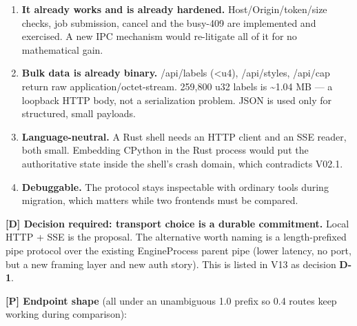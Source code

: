 \documentclass[10pt,a4paper]{article}
\newcommand{\tightlist}{\setlength{\itemsep}{2pt}\setlength{\parskip}{0pt}}
\begin{document}
\begin{enumerate}
\def\labelenumi{\arabic{enumi}.}
\tightlist
\item
  \textbf{It already works and is already hardened.} Host/Origin/token/size checks, job submission, cancel and the busy-409 are implemented and exercised. A new IPC mechanism would re-litigate all of it for no mathematical gain.
\item
  \textbf{Bulk data is already binary.} {\codefont /\allowbreak{}api/\allowbreak{}labels} ({\codefont <u4}), {\codefont /\allowbreak{}api/\allowbreak{}styles}, {\codefont /\allowbreak{}api/\allowbreak{}cap} return raw {\codefont application/\allowbreak{}octet-\allowbreak{}stream}. 259,800 {\codefont u32} labels is \textasciitilde1.04 MB --- a loopback HTTP body, not a serialization problem. JSON is used only for structured, small payloads.
\item
  \textbf{Language-neutral.} A Rust shell needs an HTTP client and an SSE reader, both small. Embedding CPython in the Rust process would put the authoritative state inside the shell's crash domain, which contradicts V02.1.
\item
  \textbf{Debuggable.} The protocol stays inspectable with ordinary tools during migration, which matters while two frontends must be compared.
\end{enumerate}

\textbf{{[}D{]} Decision required: transport choice is a durable commitment.} Local HTTP + SSE is the proposal. The alternative worth naming is a length-prefixed pipe protocol over the existing {\codefont EngineProcess} parent pipe (lower latency, no port, but a new framing layer and new auth story). This is listed in V13 as decision \textbf{D-1}.

\textbf{{[}P{]} Endpoint shape} (all under an unambiguous 1.0 prefix so 0.4 routes keep working during comparison):
\end{document}
